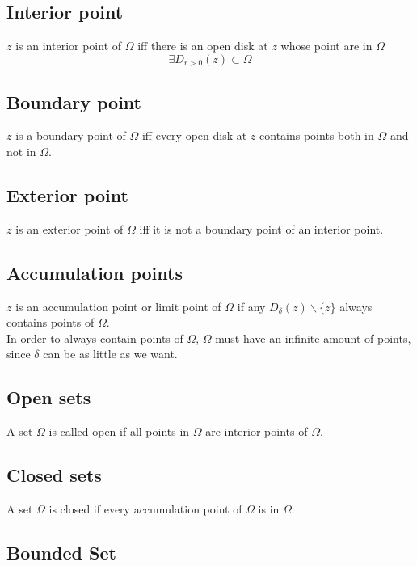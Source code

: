 \documentclass[a4paper]{article}
\begin{document}
\subsection{Interior point}

\(z\) is an interior point of \(\Omega\) iff there is an open disk
at \(z\) whose point are in \(\Omega\)
\[
    \exists D_{r>0}(z) \subset \Omega
\]

\subsection{Boundary point}

\(z\) is a boundary point of \(\Omega\) iff every open disk at \(z\)
contains points both in \(\Omega\) and not in \(\Omega\).

\subsection{Exterior point}

\(z\) is an exterior point of \(\Omega\) iff it is not a boundary
point of an interior point.

\subsection{Accumulation points}

\(z\) is an accumulation point or limit point of \(\Omega\) if any
\(D_\delta(z)\backslash \{z\}\) always contains points of \(\Omega\).
\\
In order to always contain points of \(\Omega\), \(\Omega\) must have an
infinite amount of points, since \(\delta\) can be as little as we want.

\subsection{Open sets}

A set \(\Omega\) is called open if all points in \(\Omega\)
are interior points of \(\Omega\).

\subsection{Closed sets}

A set \(\Omega\) is closed if every accumulation point of \(\Omega\)
is in \(\Omega\). 

\subsection{Bounded Set}
\end{document}
